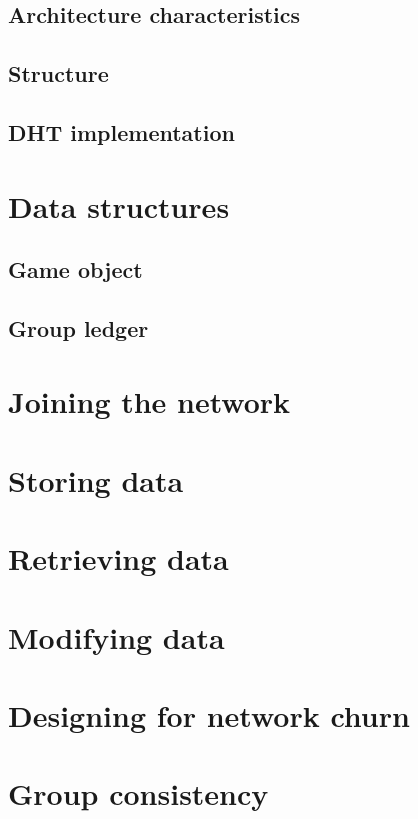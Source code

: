         \subsection{Architecture characteristics}
        \subsection{Structure}

        \subsection{DHT implementation}

    \section{Data structures}

        \subsection{Game object}

        \subsection{Group ledger}

    \section{Joining the network}

    \section{Storing data}

    \section{Retrieving data}

    \section{Modifying data}

    \section{Designing for network churn}

    \section{Group consistency}

